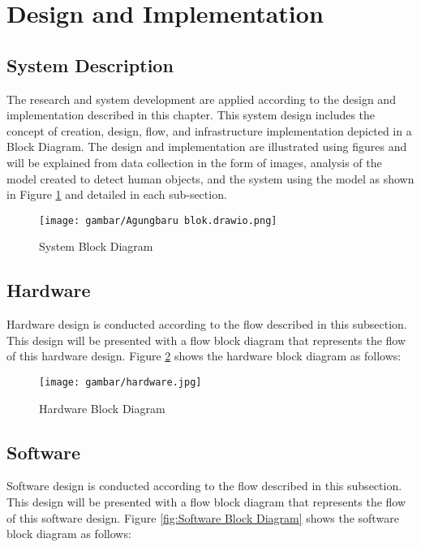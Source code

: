 \section{Design and Implementation}
\label{sec:designandimplementation}

\subsection{System Description}
\label{sec:systemdescription}
The research and system development are applied according to the design and implementation described in this chapter. This system design includes the concept of creation, design, flow, and infrastructure implementation depicted in a Block Diagram. The design and implementation are illustrated using figures and will be explained from data collection in the form of images, analysis of the model created to detect human objects, and the system using the model as shown in Figure \ref{fig:System Block Diagram} and detailed in each sub-section.

\begin{figure}[H]
  \centering

  \texttt{[image: gambar/Agungbaru blok.drawio.png]}

  \caption{System Block Diagram}
  \label{fig:System Block Diagram}
\end{figure}

\subsection{Hardware}
Hardware design is conducted according to the flow described in this subsection. This design will be presented with a flow block diagram that represents the flow of this hardware design. Figure \ref{fig:Hardware Block Diagram} shows the hardware block diagram as follows:
\begin{figure}[H]
  \centering

  \texttt{[image: gambar/hardware.jpg]}

  \caption{Hardware Block Diagram}
  \label{fig:Hardware Block Diagram}
\end{figure}

\subsection{Software}
Software design is conducted according to the flow described in this subsection. This design will be presented with a flow block diagram that represents the flow of this software design. Figure \ref{fig:Software Block Diagram} shows the software block diagram as follows:

